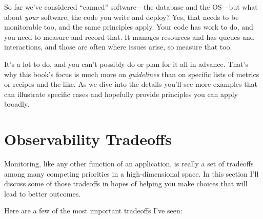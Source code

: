 \documentclass{vivid_layout}
\begin{document}
So far we've considered ``canned'' software---the database and the OS---but what
about \emph{your} software, the code you write and deploy? Yes, that needs to be
monitorable too, and the same principles apply. Your code has work to do, and
you need to measure and record that. It manages resources and has queues and
interactions, and those are often where issues arise, so measure that too.

It's a lot to do, and you can't possibly do or plan for it all in advance.
That's why this book's focus is much more on \emph{guidelines} than on specific
lists of metrics or recipes and the like. As we dive into the details you'll see
more examples that can illustrate specific cases and hopefully provide
principles you can apply broadly.

\section{Observability Tradeoffs}

Monitoring, like any other function of an application, is really a set of
tradeoffs among many competing priorities in a high-dimensional space. In this
section I'll discuss some of those tradeoffs in hopes of helping you make
choices that will lead to better outcomes.

Here are a few of the most important tradeoffs I've seen:
\end{document}
